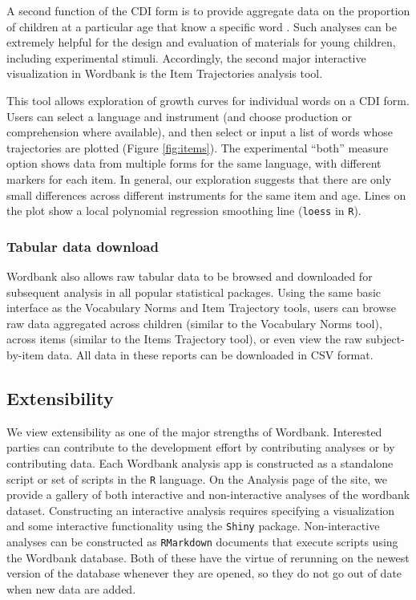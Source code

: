 \documentclass[doc,noapacite]{apa2}
\begin{document}
A second function of the CDI form is to provide aggregate data on the proportion of children at a particular age that know a specific word \cite{dale1996,jorgensen2010}. Such analyses can be extremely helpful for the design and evaluation of materials for young children, including experimental stimuli. Accordingly, the second major interactive visualization in Wordbank is the Item Trajectories analysis tool. 

This tool allows exploration of growth curves for individual words on a CDI form. Users can select a language and instrument (and choose production or comprehension where available), and then select or input a list of words whose trajectories are plotted (Figure \ref{fig:items}). The experimental ``both'' measure option shows data from multiple forms for the same language, with different markers for each item. In general, our exploration suggests that there are only small differences across different instruments for the same item and age. Lines on the plot show a local polynomial regression smoothing line (\texttt{loess} in \texttt{R}). 

\subsubsection{Tabular data download}

Wordbank also allows raw tabular data to be browsed and downloaded for subsequent analysis in all popular statistical packages. Using the same basic interface as the Vocabulary Norms and Item Trajectory tools, users can browse raw data aggregated across children (similar to the Vocabulary Norms tool), across items (similar to the Items Trajectory tool), or even view the raw subject-by-item data. All data in these reports can be downloaded in CSV format. 

\subsection{Extensibility}

We view extensibility as one of the major strengths of Wordbank. Interested parties can contribute to the development effort by contributing analyses or by contributing data. Each Wordbank analysis app is constructed as a standalone script or set of scripts in the \texttt{R} language. On the Analysis page of the site, we provide a gallery of both interactive and non-interactive analyses of the wordbank dataset. Constructing an interactive analysis requires specifying a visualization and some interactive functionality using the \texttt{Shiny} package. Non-interactive analyses can be constructed as \texttt{RMarkdown} documents that execute scripts using the Wordbank database. Both of these have the virtue of rerunning on the newest version of the database whenever they are opened, so they do not go out of date when new data are added. 
\end{document}
